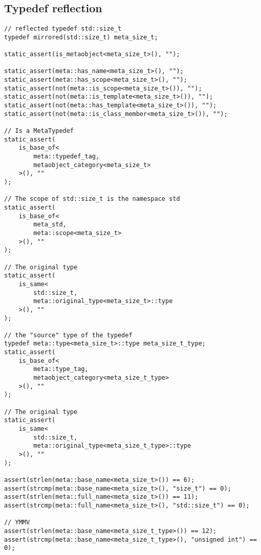 \subsection{Typedef reflection}

\begin{verbatim}
// reflected typedef std::size_t
typedef mirrored(std::size_t) meta_size_t;

static_assert(is_metaobject<meta_size_t>(), "");

static_assert(meta::has_name<meta_size_t>(), "");
static_assert(meta::has_scope<meta_size_t>(), "");
static_assert(not(meta::is_scope<meta_size_t>()), "");
static_assert(not(meta::is_template<meta_size_t>()), "");
static_assert(not(meta::has_template<meta_size_t>()), "");
static_assert(not(meta::is_class_member<meta_size_t>()), "");

// Is a MetaTypedef
static_assert(
	is_base_of<
		meta::typedef_tag,
		metaobject_category<meta_size_t>
	>(), ""
);

// The scope of std::size_t is the namespace std
static_assert(
	is_base_of<
		meta_std,
		meta::scope<meta_size_t>
	>(), ""
);

// The original type
static_assert(
	is_same<
		std::size_t,
		meta::original_type<meta_size_t>::type
	>(), ""
);

// the "source" type of the typedef
typedef meta::type<meta_size_t>::type meta_size_t_type;
static_assert(
	is_base_of<
		meta::type_tag,
		metaobject_category<meta_size_t_type>
	>(), ""
);

// The original type
static_assert(
	is_same<
		std::size_t,
		meta::original_type<meta_size_t_type>::type
	>(), ""
);

assert(strlen(meta::base_name<meta_size_t>()) == 6);
assert(strcmp(meta::base_name<meta_size_t>(), "size_t") == 0);
assert(strlen(meta::full_name<meta_size_t>()) == 11);
assert(strcmp(meta::full_name<meta_size_t>(), "std::size_t") == 0);

// YMMV
assert(strlen(meta::base_name<meta_size_t_type>()) == 12);
assert(strcmp(meta::base_name<meta_size_t_type>(), "unsigned int") == 0);
\end{verbatim}

